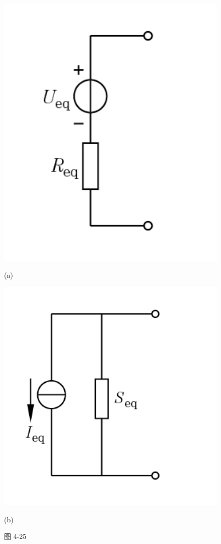 \documentclass[hyperref, UTF8]{ctexart}
\begin{document}
\begin{figure}[!htb]
\centering
\begin{minipage}[t]{0.179\textwidth}
\centering
\includegraphics[width=1\textwidth]{p4-25-sol1.png}
\caption*{(a)}
\end{minipage}
\begin{minipage}[t]{0.210\textwidth}
\centering
\includegraphics[width=1\textwidth]{p4-25-sol2.png}
\caption*{(b)}
\end{minipage}
\caption*{图 4-25}
\end{figure}
\end{document}
